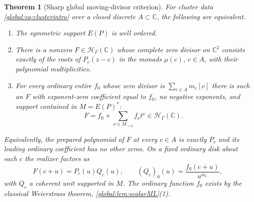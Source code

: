 \documentclass[11pt,letterpaper]{article}
\newtheorem{theorem}{Theorem}[section]
\theoremstyle{definition}
\theoremstyle{remark}
\newcommand{\C}{\mathbb C}
\newcommand{\HH}{\mathscr H_\Gamma}
\newcommand{\sh}{^{\sharp}}
\numberwithin{equation}{section}
\begin{document}
\begin{theorem}[Sharp global moving-divisor criterion]\label{global:thm:divisor}
For cluster data \eqref{global:eq:clusterintro} over a closed discrete $A\subset\C$, the following are equivalent.
\begin{enumerate}
\item The symmetric support $E(P)$ is well ordered.
\item There is a nonzero $F\in\HH(\C)$ whose complete zero divisor on $\C\sh$ consists exactly of the roots of $P_c(z-c)$ in the monads $\mu(c)$, $c\in A$, with their polynomial multiplicities.
\item For \emph{every} ordinary entire $f_0$ whose zero divisor is $\sum_{c\in A}m_c[c]$ there is such an $F$ with exponent-zero coefficient equal to $f_0$, no negative exponents, and support contained in $M=E(P)^*$:
\begin{equation}\label{global:eq:realizer}
  F=f_0+\sum_{\nu\in M_{>0}}f_\nu t^\nu\in\HH(\C).
\end{equation}
\end{enumerate}
Equivalently, the prepared polynomial of $F$ at every $c\in A$ is exactly $P_c$ and its leading ordinary coefficient has no other zeros. On a fixed ordinary disk about each $c$ the realizer factors as
\begin{equation}\label{global:eq:realizerlocal}
  F(c+u)=P_c(u)Q_c(u),
  \qquad (Q_c)_0(u)=\frac{f_0(c+u)}{u^{m_c}},
\end{equation}
with $Q_c$ a coherent unit supported in $M$. The ordinary function $f_0$ exists by the classical Weierstrass theorem, \cref{global:lem:scalarML}(1).
\end{theorem}
\end{document}
